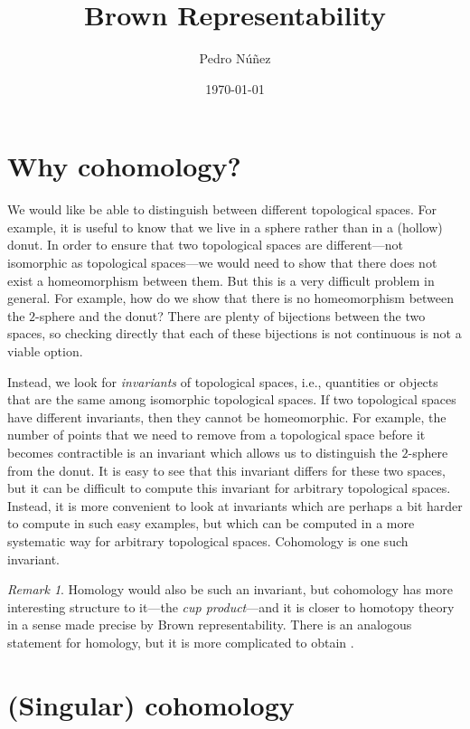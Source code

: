 \documentclass[12pt,a4paper]{amsart}
\title[Brown Representability]{Brown Representability}
\author[Pedro N\'{u}\~{n}ez]{Pedro N\'{u}\~{n}ez}\thanks{{\itshape Email:}~\href{mailto:pedro.nunez@math.uni-freiburg.de}{pedro.nunez@math.uni-freiburg.de}. \\ \indent {\itshape Homepage:}~\href{https://home.mathematik.uni-freiburg.de/nunez/?l=en}{https://home.mathematik.uni-freiburg.de/nunez}}
\date{\today}
\theoremstyle{plain}
\theoremstyle{definition}
\theoremstyle{remark}
\newtheorem{rem}[thm]{Remark}
\begin{document}
\maketitle

\tableofcontents

\section{Why cohomology?}

We would like be able to distinguish between different topological spaces.
For example, it is useful to know that we live in a sphere rather than in a (hollow) donut.
In order to ensure that two topological spaces are different---not isomorphic as topological spaces---we would need to show that there does not exist a homeomorphism between them.
But this is a very difficult problem in general.
For example, how do we show that there is no homeomorphism between the $2$-sphere and the donut?
There are plenty of bijections between the two spaces, so checking directly that each of these bijections is not continuous is not a viable option.

Instead, we look for \emph{invariants} of topological spaces, i.e., quantities or objects that are the same among isomorphic topological spaces.
If two topological spaces have different invariants, then they cannot be homeomorphic.
For example, the number of points that we need to remove from a topological space before it becomes contractible is an invariant which allows us to distinguish the $2$-sphere from the donut.
It is easy to see that this invariant differs for these two spaces, but it can be difficult to compute this invariant for arbitrary topological spaces.
Instead, it is more convenient to look at invariants which are perhaps a bit harder to compute in such easy examples, but which can be computed in a more systematic way for arbitrary topological spaces.
Cohomology is one such invariant.

\begin{rem}
  Homology would also be such an invariant, but cohomology has more interesting structure to it---the \emph{cup product}---and it is closer to homotopy theory in a sense made precise by Brown representability.
  There is an analogous statement for homology, but it is more complicated to obtain \cite[\S 4.F]{hat02}.
\end{rem}

\section{(Singular) cohomology}
\end{document}
